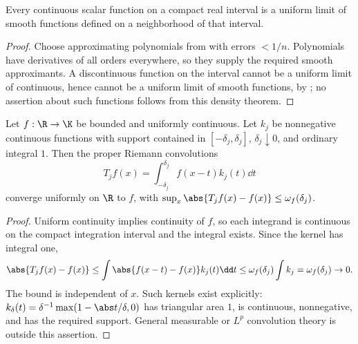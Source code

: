 \begin{theorem}
Every continuous scalar function on a compact real interval is a uniform limit of smooth functions defined on a neighborhood of that interval.
\end{theorem}
\begin{proof}
Choose approximating polynomials from  with errors $<1/n$. Polynomials have derivatives of all orders everywhere, so they supply the required smooth approximants. A discontinuous function on the interval cannot be a uniform limit of continuous, hence cannot be a uniform limit of smooth functions, by ; no assertion about such functions follows from this density theorem.
\end{proof}

\begin{theorem}
Let $f:\R\to\K$ be bounded and uniformly continuous. Let $k_j$ be nonnegative continuous functions with support contained in $[-\delta_j,\delta_j]$, $\delta_j\downarrow0$, and ordinary integral $1$. Then the proper Riemann convolutions
\[T_jf(x)=\int_{-\delta_j}^{\delta_j}f(x-t)k_j(t)\dd t\]
converge uniformly on $\R$ to $f$, with $\sup_x\abs{T_jf(x)-f(x)}\leq\omega_f(\delta_j)$.
\end{theorem}
\begin{proof}
Uniform continuity implies continuity of $f$, so each integrand is continuous on the compact integration interval and the integral exists. Since the kernel has integral one,
\[\abs{T_jf(x)-f(x)}\leq\int\abs{f(x-t)-f(x)}k_j(t)\dd t\leq\omega_f(\delta_j)\int k_j=\omega_f(\delta_j)\to0.\]
The bound is independent of $x$. Such kernels exist explicitly: $k_\delta(t)=\delta^{-1}\max(1-\abs t/\delta,0)$ has triangular area $1$, is continuous, nonnegative, and has the required support. General measurable or $L^p$ convolution theory is outside this assertion.
\end{proof}

